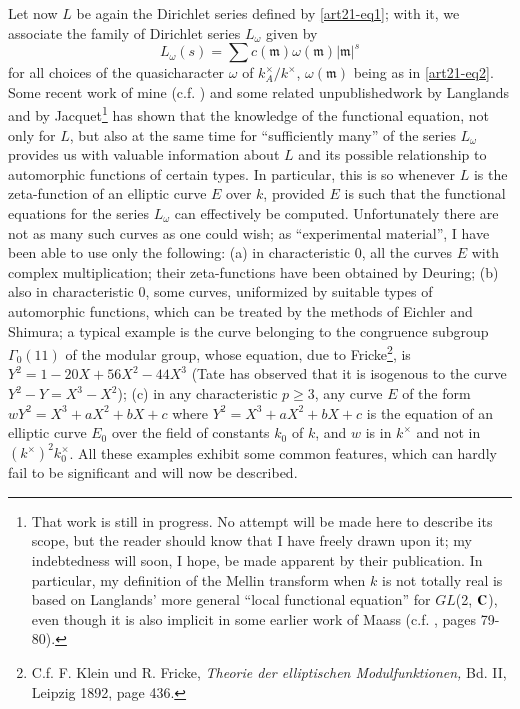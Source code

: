 Let now $L$ be again the Dirichlet series defined by \eqref{art21-eq1}; with it, we associate the family of Dirichlet series $L_{\omega}$ given by
\begin{equation*}
L_{\omega}(s)=\sum c(\mathfrak{m})\omega(\mathfrak{m})|\mathfrak{m}|^{s}\tag{4}\label{art21-eq4}
\end{equation*}
for all choices of the quasicharacter $\omega$ of $k^{\times}_{A}/k^{\times}$, $\omega(\mathfrak{m})$ being as in \eqref{art21-eq2}. Some recent work of mine (c.f. \cite{art21-key2}) and some related unpublished\pageoriginale work by Langlands and by Jacquet\footnote[2]{That work is still in progress. No attempt will be made here to describe its scope, but the reader should know that I have freely drawn upon it; my indebtedness will soon, I hope, be made apparent by their publication. In particular, my definition of the Mellin transform when $k$ is not totally real is based on Langlands' more general ``local functional equation'' for $GL$(2, $\mathbf{C}$), even though it is also implicit in some earlier work of Maass (c.f. \cite{art21-key1}, pages 79-80).} has shown that the knowledge of the functional equation, not only for $L$, but also at the same time for ``sufficiently many'' of the series $L_{\omega}$ provides us with valuable information about $L$ and its possible relationship to automorphic functions of certain types. In particular, this is so whenever $L$ is the zeta-function of an elliptic curve $E$ over $k$, provided $E$ is such that the functional equations for the series $L_{\omega}$ can effectively be computed. Unfortunately there are not as many such curves as one could wish; as ``experimental material'', I have been able to use only the following: (a) in characteristic $0$, all the curves $E$ with complex multiplication; their zeta-functions have been obtained by Deuring; (b) also in characteristic 0, some curves, uniformized by suitable types of automorphic functions, which can be treated by the methods of Eichler and Shimura; a typical example is the curve belonging to the congruence subgroup $\Gamma_{0}(11)$ of the modular group, whose equation, due to Fricke\footnote[3]{C.f. F. Klein und R. Fricke, {\em Theorie der elliptischen Modulfunktionen,} Bd. II, Leipzig 1892, page 436.}, is $Y^{2}=1-20X+56X^{2}-44X^{3}$ (Tate has observed that it is isogenous to the curve $Y^{2}-Y=X^{3}-X^{2}$); (c) in any characteristic $p\geq 3$, any curve $E$ of the form $wY^{2}=X^{3}+aX^{2}+bX+c$ where $Y^{2}=X^{3}+aX^{2}+bX+c$ is the equation of an elliptic curve $E_{0}$ over the field of constants $k_{0}$ of $k$, and $w$ is in $k^{\times}$ and not in $(k^{\times})^{2}k^{\times}_{0}$. All these examples exhibit some common features, which can hardly fail to be significant and will now be described.

